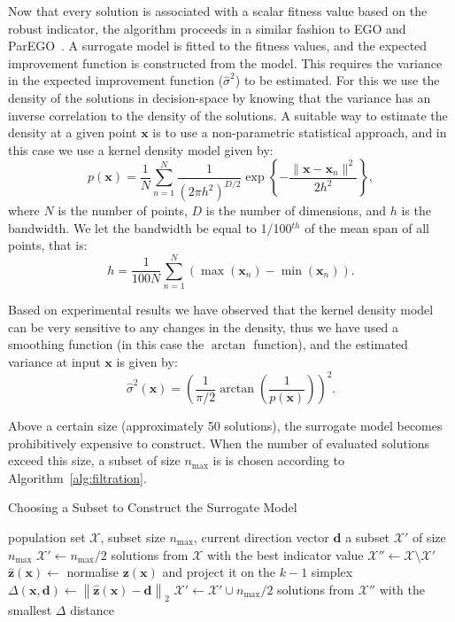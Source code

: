 \documentclass{llncs}
\newcommand{\brr}[1]{{\left({#1}\right)}} %
\newcommand{\norm}[2]{\left\|{#1}\right\|_{#2}} %
\newcommand{\vx}{\mathbf{x}} %
\newcommand{\vz}{\mathbf{z}} %
\newcommand{\vd}{\mathbf{d}} %
\newcommand{\XSet}{\mathcal{X}} %
\begin{document}
Now that every solution is associated with a scalar fitness value based on the robust indicator, the algorithm proceeds in a similar fashion to EGO and ParEGO~\cite{Jones1998Efficient,knowles2005multiobjective}. A surrogate model is fitted to the fitness values, and the expected improvement function is constructed from the model. This requires the variance in the expected improvement function ($\hat{\sigma}^2$) to be estimated. For this we use the density of the solutions in decision-space by knowing that the variance has an inverse correlation to the density of the solutions. A suitable way to estimate the density at a given point $\vx$ is to use a non-parametric statistical approach, and in this case we use a kernel density model given by:
\begin{equation}
 p(\vx) = \frac{1}{N} \sum^{N}_{n=1} \frac{1}{(2\pi h^2)^{D/2}}   \exp\left\{-\frac{\| \vx-\vx_n \|^2}{2h^2}\right\},
\end{equation}
where $N$ is the number of points, $D$ is the number of dimensions, and $h$ is the bandwidth. We let the bandwidth be equal to 1/100$^{th}$ of the mean span of all points, that is:
\begin{equation}
 h = \frac{1}{100N}\sum_{n=1}^{N} (\max(\vx_n) - \min(\vx_n)).
\end{equation}

Based on experimental results we have observed that the kernel density model can be very sensitive to any changes in the density, thus we have used a smoothing function (in this case the $\arctan$ function), and the estimated variance at input $\vx$ is given by:
\begin{equation}
 \hat{\sigma}^2(\vx) = \left( \frac{1}{\pi/2} \arctan \left(\frac{1}{p(\vx)}\right) \right)^2.
\end{equation}

Above a certain size (approximately 50 solutions), the surrogate model becomes prohibitively expensive to construct. When the number of evaluated solutions exceed this size, a subset of size $n_\text{max}$ is is chosen according to Algorithm~\ref{alg:filtration}.

\begin{algorithm}
\caption{Choosing a Subset to Construct the Surrogate Model}
\label{alg:filtration}
\begin{algorithmic}[1]
	\Require population set $\XSet$, subset size $n_\text{max}$, current direction vector $\vd$
	\Ensure a subset $\XSet'$ of size $n_\text{max}$
	\State $\XSet' \leftarrow n_\text{max}/2$ solutions from $\XSet$ with the best indicator value
	\State $\XSet'' \leftarrow \XSet \setminus \XSet'$
	\ForAll{$\vx \in \XSet''$}
		\State $\hat{\vz}\brr{\vx} \leftarrow$ normalise $\vz\brr{\vx}$ and project it on the $k-1$ simplex
		\State $\Delta\brr{\vx, \vd} \leftarrow \norm{\hat{\vz}\brr{\vx} - \vd}{2}$
	\EndFor
	\State $\XSet' \leftarrow \XSet' \cup n_\text{max}/2$ solutions from $\XSet''$ with the smallest $\Delta$ distance
\end{algorithmic}
\end{algorithm}
\end{document}
